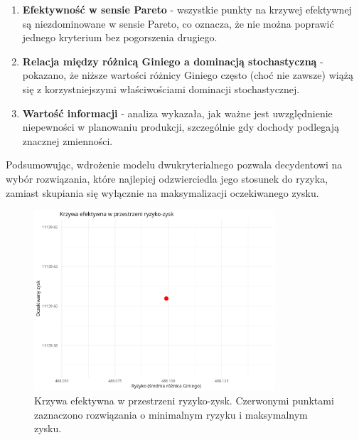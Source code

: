 \documentclass[12pt]{article}
\begin{document}
\begin{enumerate}
  \item \textbf{Efektywność w sensie Pareto} - wszystkie punkty na krzywej efektywnej są niezdominowane w sensie Pareto, co oznacza, że nie można poprawić jednego kryterium bez pogorszenia drugiego.
  \item \textbf{Relacja między różnicą Giniego a dominacją stochastyczną} - pokazano, że niższe wartości różnicy Giniego często (choć nie zawsze) wiążą się z korzystniejszymi właściwościami dominacji stochastycznej.
  \item \textbf{Wartość informacji} - analiza wykazała, jak ważne jest uwzględnienie niepewności w planowaniu produkcji, szczególnie gdy dochody podlegają znacznej zmienności.
\end{enumerate}

Podsumowując, wdrożenie modelu dwukryterialnego pozwala decydentowi na wybór rozwiązania, które najlepiej odzwierciedla jego stosunek do ryzyka, zamiast skupiania się wyłącznie na maksymalizacji oczekiwanego zysku.

\begin{figure}[ht]
    \centering
    \includegraphics[width=0.8\textwidth]{efficient_frontier.png}
    \caption{Krzywa efektywna w przestrzeni ryzyko-zysk. Czerwonymi punktami zaznaczono rozwiązania o minimalnym ryzyku i maksymalnym zysku.}
    \label{fig:efficient_frontier}
\end{figure}
\end{document}
